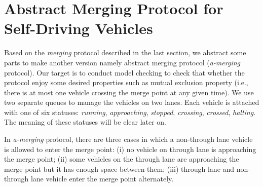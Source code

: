 \documentclass[10pt, conference, compsocconf]{IEEEtran}
\begin{document}


\section{Abstract Merging Protocol for Self-Driving Vehicles}
 \label{sect_reviproto}
Based on the \textit{merging} protocol described in the last section, we abstract some parts to make another version namely abstract merging protocol (\textit{a-merging} protocol).
Our target is to conduct model checking to check that whether the protocol enjoy some desired properties such as mutual exclusion property (i.e., there is at most one vehicle crossing the merge point at any given time).
We use two separate queues to manage the vehicles on two lanes.
Each vehicle is attached with one of six statuses: \textit{running}, \textit{approaching}, \textit{stopped}, \textit{crossing}, \textit{crossed}, \textit{halting}.
The meaning of these statuses will be clear later on.


In \textit{a-merging} protocol, there are three cases in which a non-through lane vehicle is allowed to enter the merge point: 
(i) no vehicle on through lane is approaching the merge point; 
(ii) some vehicles on the through lane are approaching the merge point but it has enough space between them; 
(iii) through lane and non-through lane vehicle enter the merge point alternately. 
\end{document}
